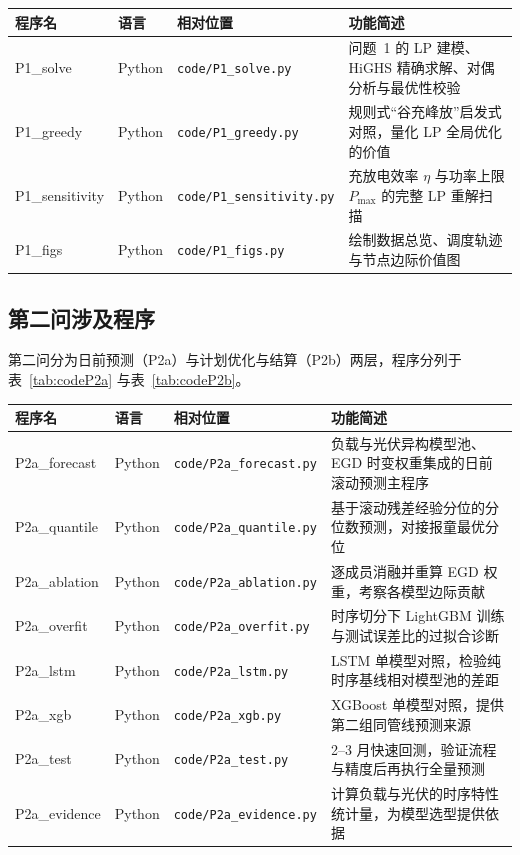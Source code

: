\documentclass[zihao=-4,a4paper,fontset=none]{ctexart}
\begin{document}
\noindent\begin{minipage}{\textwidth}
\centering
{}\label{tab:codeP1}
{\footnotesize
\begin{tabular}{@{}p{2.4cm}p{0.9cm}p{3.7cm}p{6.4cm}@{}}
\toprule
程序名 & 语言 & 相对位置 & 功能简述 \\
\midrule
P1\_solve & Python & \texttt{code/P1\_solve.py} & 问题~1 的 LP 建模、HiGHS 精确求解、对偶分析与最优性校验 \\
P1\_greedy & Python & \texttt{code/P1\_greedy.py} & 规则式“谷充峰放”启发式对照，量化 LP 全局优化的价值 \\
P1\_sensitivity & Python & \texttt{code/P1\_sensitivity.py} & 充放电效率 $\eta$ 与功率上限 $P_{\max}$ 的完整 LP 重解扫描 \\
P1\_figs & Python & \texttt{code/P1\_figs.py} & 绘制数据总览、调度轨迹与节点边际价值图 \\
\bottomrule
\end{tabular}}
\end{minipage}

\subsection{第二问涉及程序}

第二问分为日前预测（P2a）与计划优化与结算（P2b）两层，程序分列于表~\ref{tab:codeP2a}
与表~\ref{tab:codeP2b}。

\noindent\begin{minipage}{\textwidth}
\centering
{}\label{tab:codeP2a}
{\footnotesize
\begin{tabular}{@{}p{2.4cm}p{0.9cm}p{3.7cm}p{6.4cm}@{}}
\toprule
程序名 & 语言 & 相对位置 & 功能简述 \\
\midrule
P2a\_forecast & Python & \texttt{code/P2a\_forecast.py} & 负载与光伏异构模型池、EGD 时变权重集成的日前滚动预测主程序 \\
P2a\_quantile & Python & \texttt{code/P2a\_quantile.py} & 基于滚动残差经验分位的分位数预测，对接报童最优分位 \\
P2a\_ablation & Python & \texttt{code/P2a\_ablation.py} & 逐成员消融并重算 EGD 权重，考察各模型边际贡献 \\
P2a\_overfit & Python & \texttt{code/P2a\_overfit.py} & 时序切分下 LightGBM 训练与测试误差比的过拟合诊断 \\
P2a\_lstm & Python & \texttt{code/P2a\_lstm.py} & LSTM 单模型对照，检验纯时序基线相对模型池的差距 \\
P2a\_xgb & Python & \texttt{code/P2a\_xgb.py} & XGBoost 单模型对照，提供第二组同管线预测来源 \\
P2a\_test & Python & \texttt{code/P2a\_test.py} & 2--3 月快速回测，验证流程与精度后再执行全量预测 \\
P2a\_evidence & Python & \texttt{code/P2a\_evidence.py} & 计算负载与光伏的时序特性统计量，为模型选型提供依据 \\
\bottomrule
\end{tabular}}
\end{minipage}
\end{document}
